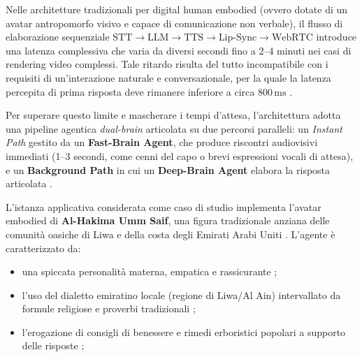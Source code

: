 \documentclass[11pt,a4paper]{article}
\begin{document}
Nelle architetture tradizionali per digital human embodied (ovvero dotate di un avatar antropomorfo visivo e capace di comunicazione non verbale), il flusso di elaborazione sequenziale $\text{STT} \rightarrow \text{LLM} \rightarrow \text{TTS} \rightarrow \text{Lip-Sync} \rightarrow \text{WebRTC}$ introduce una latenza complessiva che varia da diversi secondi fino a 2--4 minuti nei casi di rendering video complessi. Tale ritardo risulta del tutto incompatibile con i requisiti di un'interazione naturale e conversazionale, per la quale la latenza percepita di prima risposta deve rimanere inferiore a circa $800\,\text{ms}$ \cite{projectspec,damianiasset}.


Per superare questo limite e mascherare i tempi d'attesa, l'architettura adotta una pipeline agentica \emph{dual-brain} articolata su due percorsi paralleli: un \emph{Instant Path} gestito da un \textbf{Fast-Brain Agent}, che produce riscontri audiovisivi immediati (1--3 secondi, come cenni del capo o brevi espressioni vocali di attesa), e un \textbf{Background Path} in cui un \textbf{Deep-Brain Agent} elabora la risposta articolata \cite{projectspec,damianiasset}.

L'istanza applicativa considerata come caso di studio implementa l'avatar embodied di \textbf{Al-Hakima Umm Saif}, una figura tradizionale anziana delle comunità oasiche di Liwa e della costa degli Emirati Arabi Uniti \cite{persona}. L'agente è caratterizzato da:
\begin{itemize}
    \item una spiccata personalità materna, empatica e rassicurante \cite{persona};
    \item l'uso del dialetto emiratino locale (regione di Liwa/Al Ain) intervallato da formule religiose e proverbi tradizionali \cite{verbalhabits};
    \item l'erogazione di consigli di benessere e rimedi erboristici popolari a supporto delle risposte \cite{verbalhabits};
\end{itemize}
\end{document}
